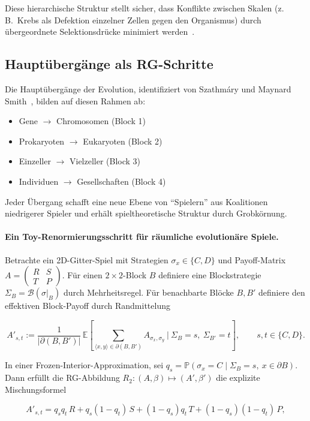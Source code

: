 \documentclass[12pt,a4paper]{article}
\theoremstyle{remark}
\begin{document}
Diese hierarchische Struktur stellt sicher, dass Konflikte zwischen Skalen (z.\,B.\ Krebs als Defektion einzelner Zellen gegen den Organismus) durch übergeordnete Selektionsdrücke minimiert werden~\citep{ReplicatorOptimization}.

\subsection{Hauptübergänge als RG-Schritte}

Die Hauptübergänge der Evolution, identifiziert von Szathm\'ary und Maynard Smith~\citep{SzathmaryMaynardSmith1995}, bilden auf diesen Rahmen ab:

\begin{itemize}
    \item Gene $\to$ Chromosomen (Block 1)
    \item Prokaryoten $\to$ Eukaryoten (Block 2)
    \item Einzeller $\to$ Vielzeller (Block 3)
    \item Individuen $\to$ Gesellschaften (Block 4)
\end{itemize}

Jeder Übergang schafft eine neue Ebene von ``Spielern'' aus Koalitionen niedrigerer Spieler und erhält spieltheoretische Struktur durch Grobkörnung.

\paragraph{Ein Toy-Renormierungsschritt für räumliche evolutionäre Spiele.}
Betrachte ein 2D-Gitter-Spiel mit Strategien $\sigma_x\in\{C,D\}$ und Payoff-Matrix
$A=\begin{pmatrix}R&S\\ T&P\end{pmatrix}$.
Für einen $2\times 2$-Block $B$ definiere eine Blockstrategie $\Sigma_B=\mathcal B(\sigma|_B)$ durch Mehrheitsregel.
Für benachbarte Blöcke $B,B'$ definiere den effektiven Block-Payoff durch Randmittelung

\[
A'_{s,t}
:=\frac{1}{|\partial(B,B')|}\,
\mathbb E\!\left[\sum_{\langle x,y\rangle\in\partial(B,B')} A_{\sigma_x,\sigma_y}\ \Big|\ \Sigma_B=s,\ \Sigma_{B'}=t\right],
\qquad s,t\in\{C,D\}.
\]

In einer Frozen-Interior-Approximation, sei
$q_s=\mathbb P(\sigma_x=C\mid \Sigma_B=s,\ x\in\partial B)$.
Dann erfüllt die RG-Abbildung $R_2:(A,\beta)\mapsto(A',\beta')$ die explizite Mischungsformel

\[
A'_{s,t}
= q_s q_t\,R + q_s(1-q_t)\,S + (1-q_s)q_t\,T + (1-q_s)(1-q_t)\,P,
\]
\end{document}
